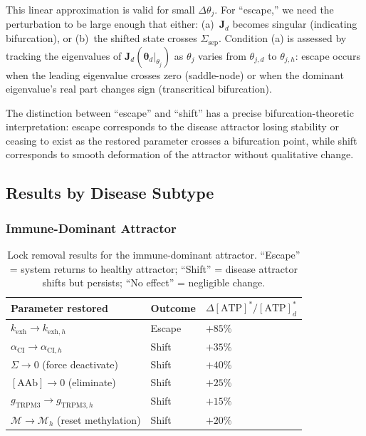 This linear approximation is valid for small $\Delta\theta_j$. For ``escape,'' we need the perturbation to be large enough that either: (a)~$\mathbf{J}_d$ becomes singular (indicating bifurcation), or (b)~the shifted state crosses $\Sigma_{\mathrm{sep}}$. Condition (a) is assessed by tracking the eigenvalues of $\mathbf{J}_d(\boldsymbol{\theta}_d|_{\theta_j})$ as $\theta_j$ varies from $\theta_{j,d}$ to $\theta_{j,h}$: escape occurs when the leading eigenvalue crosses zero (saddle-node) or when the dominant eigenvalue's real part changes sign (transcritical bifurcation).

The distinction between ``escape'' and ``shift'' has a precise bifurcation-theoretic interpretation: escape corresponds to the disease attractor losing stability or ceasing to exist as the restored parameter crosses a bifurcation point, while shift corresponds to smooth deformation of the attractor without qualitative change.

\subsection{Results by Disease Subtype}

\subsubsection{Immune-Dominant Attractor}

\begin{table}[htbp]
\centering
\caption{Lock removal results for the immune-dominant attractor. ``Escape'' = system returns to healthy attractor; ``Shift'' = disease attractor shifts but persists; ``No effect'' = negligible change.}
\label{tab:lock-immune}
\begin{tabular}{lll}
\hline
Parameter restored & Outcome & $\Delta[\text{ATP}]^*/[\text{ATP}]_d^*$ \\
\hline
$k_{\text{exh}} \to k_{\text{exh},h}$ & Escape & $+85\%$ \\
$\alpha_{\text{CI}} \to \alpha_{\text{CI},h}$ & Shift & $+35\%$ \\
$\Sigma \to 0$ (force deactivate) & Shift & $+40\%$ \\
$[\text{AAb}] \to 0$ (eliminate) & Shift & $+25\%$ \\
$g_{\text{TRPM3}} \to g_{\text{TRPM3},h}$ & Shift & $+15\%$ \\
$\mathcal{M} \to \mathcal{M}_h$ (reset methylation) & Shift & $+20\%$ \\
\hline
\end{tabular}
\end{table}

